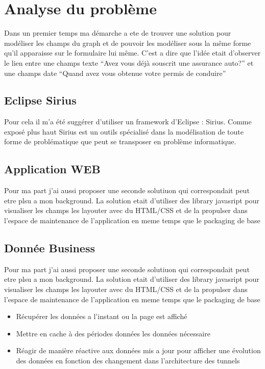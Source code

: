 \chapter{Analyse du problème}

Dans un premier temps ma démarche a ete de trouver une solution pour modéliser les champs du graph et de pouvoir les modéliser sous la même forme qu’il apparaisse sur le formulaire lui même. C’est a dire que l’idée etait d’observer le lien entre une champs texte “Avez vous déjà souscrit une assurance auto?” et une champs date “Quand avez vous obtenue votre permis de conduire”

\section{Eclipse Sirius}
Pour cela il m’a été suggérer d’utiliser un framework d’Eclipse : Sirius. Comme exposé plus haut Sirius est un outils spécialisé dans la modélisation de toute forme de problématique que peut se transposer en problème informatique.

\section{Application WEB}
Pour ma part j’ai aussi proposer une seconde solutiuon qui correspondait peut etre plsu a mon background. La solution etait d’utiliser  des library javasript pour visualiser les champs les layouter avec du HTML/CSS et de la propulser dans l’espace de maintenance de l’application en meme temps que le packaging de base

\section{Donnée Business}
Pour ma part j’ai aussi proposer une seconde solutiuon qui correspondait peut etre plsu a mon background. La solution etait d’utiliser  des library javasript pour visualiser les champs les layouter avec du HTML/CSS et de la propulser dans l’espace de maintenance de l’application en meme temps que le packaging de base

\begin{itemize}
\item Récupérer les données a l’instant ou la page est affiché 
\item Mettre en cache à des périodes données les données nécessaire
\item Réagir de manière réactive aux données mis a jour pour afficher une évolution des données en fonction des changement dans l’architecture des tunnels
\end{itemize}

